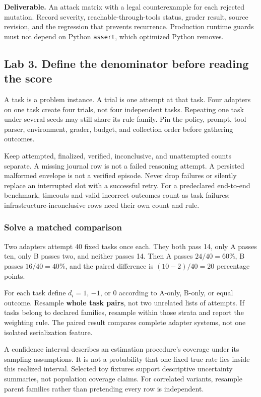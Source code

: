 \documentclass[
  11pt,
  letterpaper,
]{article}
\begin{document}
\textbf{Deliverable.} An attack matrix with a legal counterexample for
each rejected mutation. Record severity, reachable-through-tools status,
grader result, source revision, and the regression that prevents
recurrence. Production runtime guards must not depend on Python
\texttt{assert}, which optimized Python removes.

\subsection{Lab 3. Define the denominator before reading the
score}\label{lab-3.-define-the-denominator-before-reading-the-score}

A task is a problem instance. A trial is one attempt at that task. Four
adapters on one task create four trials, not four independent tasks.
Repeating one task under several seeds may still share its rule family.
Pin the policy, prompt, tool parser, environment, grader, budget, and
collection order before gathering outcomes.

Keep attempted, finalized, verified, inconclusive, and unattempted
counts separate. A missing journal row is not a failed reasoning
attempt. A persisted malformed envelope is not a verified episode. Never
drop failures or silently replace an interrupted slot with a successful
retry. For a predeclared end-to-end benchmark, timeouts and valid
incorrect outcomes count as task failures; infrastructure-inconclusive
rows need their own count and rule.

\subsubsection{Solve a matched
comparison}\label{solve-a-matched-comparison}

Two adapters attempt 40 fixed tasks once each. They both pass 14, only A
passes ten, only B passes two, and neither passes 14. Then A passes
\(24/40=60\%\), B passes \(16/40=40\%\), and the paired difference is
\((10-2)/40=20\) percentage points.

For each task define \(d_i=1\), \(-1\), or \(0\) according to A-only,
B-only, or equal outcome. Resample \textbf{whole task pairs}, not two
unrelated lists of attempts. If tasks belong to declared families,
resample within those strata and report the weighting rule. The paired
result compares complete adapter systems, not one isolated serialization
feature.

A confidence interval describes an estimation procedure's coverage under
its sampling assumptions. It is not a probability that one fixed true
rate lies inside this realized interval. Selected toy fixtures support
descriptive uncertainty summaries, not population coverage claims. For
correlated variants, resample parent families rather than pretending
every row is independent.
\end{document}
